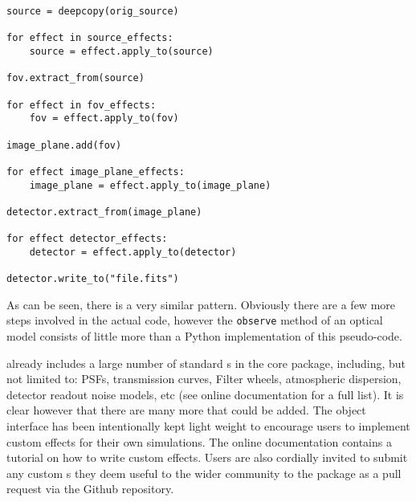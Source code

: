 \begin{lstlisting}[frame=single]
source = deepcopy(orig_source)

for effect in source_effects:
    source = effect.apply_to(source)

fov.extract_from(source)

for effect in fov_effects:
    fov = effect.apply_to(fov)

image_plane.add(fov)

for effect image_plane_effects:
    image_plane = effect.apply_to(image_plane)

detector.extract_from(image_plane)

for effect detector_effects:
    detector = effect.apply_to(detector)

detector.write_to("file.fits")
\end{lstlisting}

As can be seen, there is a very similar pattern.
Obviously there are a few more steps involved in the actual \ScopeSim{} code, however the \lstinline{observe} method of an optical model consists of little more than a Python implementation of this pseudo-code.

\ScopeSim{} already includes a large number of standard \Effect{}s in the core package, including, but not limited to: PSFs, transmission curves, Filter wheels, atmospheric dispersion, detector readout noise models, etc (see online documentation for a full list).
It is clear however that there are many more that could be added.
The \Effect{} object interface has been intentionally kept light weight to encourage users to implement custom effects for their own simulations.
The online documentation contains a tutorial on how to write custom effects.
Users are also cordially invited to submit any custom \Effect{}s they deem useful to the wider community to the \ScopeSim{} package as a pull request via the Github repository.
